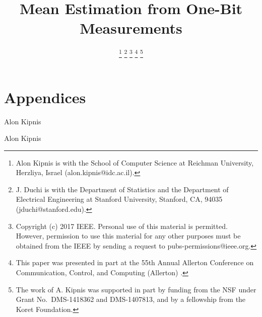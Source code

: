 \documentclass[letterpaper, 11pt]{IEEEtran}      %
\author{
    \IEEEauthorblockN{
Alon~Kipnis and   
    John~C.~Duchi}

\thanks{
Alon Kipnis is with the School of Computer Science at Reichman University, Herzliya, Israel (alon.kipnis@idc.ac.il).} 
\thanks{J. Duchi is with the Department of Statistics and the Department of Electrical Engineering at Stanford University, Stanford, CA, 94035 (jduchi@stanford.edu).}
\thanks{Copyright (c) 2017 IEEE. Personal use of this material is permitted.  However, permission to use this material for any other purposes must be obtained from the IEEE by sending a request to pubs-permissions@ieee.org.}
\thanks{This paper was presented in part at the 55th Annual Allerton Conference on Communication, Control, and Computing (Allerton) \cite{KipnisAllerton2017}. }
\thanks{
The work of A. Kipnis was supported in part by funding from the NSF under Grant No.~DMS-1418362 and DMS-1407813, and by a fellowship from the Koret Foundation.}
}
\title{\LARGE \bf Mean Estimation from One-Bit Measurements}
\begin{document}
\graphicspath{{./Figs/}}
\maketitle
















\onecolumn 

\newpage

\section*{Appendices}










\begin{IEEEbiographynophoto}{Alon Kipnis}

\end{IEEEbiographynophoto}


\begin{IEEEbiographynophoto}{Alon Kipnis}

\end{IEEEbiographynophoto}
\end{document}

